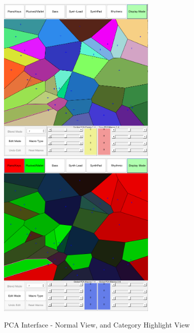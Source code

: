 \documentclass[11pt, oneside]{report}   	%
\begin{document}
\begin{figure}[h] 
	\centering
	\hspace*{-0.2cm}
	\includegraphics[width = 3.0in]{PCAInterface1.png}
	\hspace*{0.1cm}
	\includegraphics[width = 3.0in]{PCAInterface2.png}
	\caption{PCA Interface - Normal View, and Category Highlight View}
	\label{fig:PCAInterface}
\end{figure}
\end{document}
